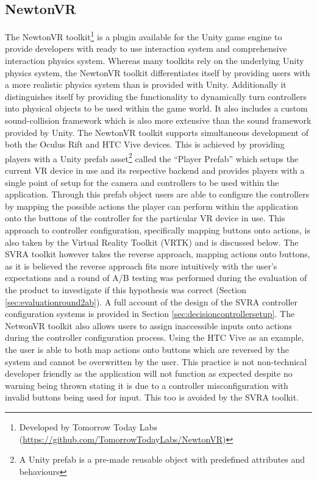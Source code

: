 \documentclass{l4proj}
\begin{document}
\subsection{NewtonVR}
\label{sec:contextnewton}
The NewtonVR toolkit\footnote{Developed by Tomorrow Today Labs (\url{https://github.com/TomorrowTodayLabs/NewtonVR})} is a plugin available for the Unity game engine to provide developers with ready to use interaction system and comprehensive interaction physics system. Whereas many toolkits rely on the underlying Unity physics system, the NewtonVR toolkit differentiates itself by providing users with a more realistic physics system than is provided with Unity. Additionally it distinguishes itself by providing the functionality to dynamically turn controllers into physical objects to be used within the game world. It also includes a custom sound-collision framework which is also more extensive than the sound framework provided by Unity. The NewtonVR toolkit supports simultaneous development of both the Oculus Rift and HTC Vive devices. This is achieved by providing players with a Unity prefab asset\footnote{A Unity prefab is a pre-made reusable object with predefined attributes and behaviours} called the ``Player Prefab'' which setups the current VR device in use and its respective backend and provides players with a single point of setup for the camera and controllers to be used within the application. Through this prefab object users are able to configure the controllers by mapping the possible actions the player can perform within the application onto the buttons of the controller for the particular VR device in use. This approach to controller configuration, specifically mapping buttons onto actions, is also taken by the Virtual Reality Toolkit (VRTK) and is discussed below. The SVRA toolkit however takes the reverse approach, mapping actions onto buttons, as it is believed the reverse approach fits more intuitively with the user's expectations and a round of A/B testing was performed during the evaluation of the product to investigate if this hypothesis was correct (Section \ref{sec:evaluationround2ab}). A full account of the design of the SVRA controller configuration systems is provided in Section \ref{sec:decisioncontrollersetup}. The NetwonVR toolkit also allows users to assign inaccessible inputs onto actions during the controller configuration process. Using the HTC Vive as an example, the user is able to both map actions onto buttons which are reversed by the system and cannot be overwritten by the user. This practice is not non-technical developer friendly as the application will not function as expected despite no warning being thrown stating it is due to a controller misconfiguration with invalid buttons being used for input. This too is avoided by the SVRA toolkit.
\end{document}
